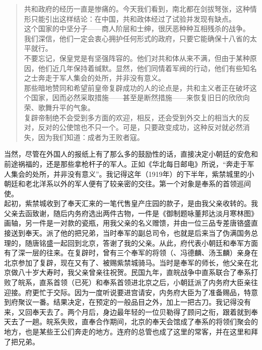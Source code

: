 \begin{quote}
	共和政府的经历一直是惨痛的。今天我们看到，南北都在剑拔弩张，这种情形只能引出这样结论：在中国，共和政体经过了试验并发现有缺点。\\

这个国家的中坚分子——商人阶层和士绅，很厌恶种种互相残杀的战争。\\

我们深信，他们一定会衷心拥护任何形式的政府，只要它能确保十八省的太平就行。\\

不要忘记，保皇党是有坚强阵容的。他们对共和体从来不满，但由于某种原因，他们近几年保持着缄默。显然，他们同情着军阀的行动，他们有些知名之士奔走于军人集会的处所，并非没有意义。\\

那些暗地赞同和希望前皇帝复辟成功的人的论点是，共和主义者正在破坏这个国家，因而必然采取措施——甚至是断然措施——来恢复旧日的欣欣向荣、歌舞升平的气象。\\

复辟帝制绝不会受到多方面的欢迎，相反，还会受到外交上的相当大的反对，反对的公使馆也不只一个。可是，只要政变成功，这种反对就必然消失，因为我们知道：成者为王败者寇。\\
\end{quote}

当然，尽管在外国人的报纸上有了那么多的鼓励性的话，直接决定小朝廷的安危和前途祸福的，还是那些拿枪杆子的军人。正如《华北每日邮电》所说，“奔走于军人集会的处所，并非没有意义”。我记得这年（1919年）的下半年，紫禁城里的小朝廷和老北洋系以外的军人便有了较亲密的交往。第一个对象是奉系的首领巡间使。\\

起初，紫禁城收到了奉天汇来的一笔代售皇产庄园的款子，是由我父亲收转的。我父亲去函致谢，随后内务府选出两件古物，一件是《御制题咏董邦达淡月寒林图》画轴，另一件是一对款的瓷瓶，用我父亲的名义赠馈，并由一位三品专差唐铬盛直接送到奉天。派了他的把兄弟，当时奉军的副总司令，也就是后来当了伪满国务总理的，随唐铭盛一起回到北京，答谢了我的父亲。从此，府代表小朝廷和奉军方面有了深一层的往来。在复辟时，曾有三个奉军的将领（、冯德麟、汤玉麟）亲身在北京参加了复辟，现在又有了、被赐紫禁城骑马。当时是奉军的师长，他父亲在北京做八十岁大寿时，我父亲曾亲往祝贺。民国九年，直皖战争中直系联合了奉系打败了皖系，直系首领（已死）和奉系首领进北京之后，小朝廷派了内务府大臣亲往迎接。府更忙于交际。因为一度听说要进宫请安，内务府大臣为了准备赐品，特意到府聚议一番。结果决定，在预定的一般品目之外，加上一把古刀。我记得没有来，又回奉天去了。两个月后，身边最年轻的一位贝勒得了顾问之衔，跟着就到奉天去了一趟。皖系失败，直奉合作期间，北京的奉天会馆成了奉系的将领们聚会的地方，也是某些王公们奔走的地方。连府的总管也成了这里的常客，并在这里和拜了把兄弟。\\

